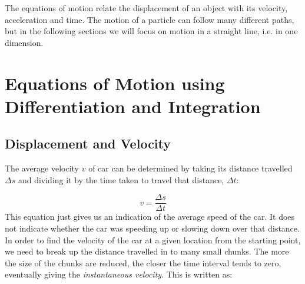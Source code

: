 





\addtolength{\topmargin}{-0.7 cm}
\setlength{\columnsep}{22pt}
\nll
The equations of motion relate the displacement of an object with its velocity, acceleration and time. The motion of a particle can follow many different paths, but in the following sections we will focus on motion in a straight line, i.e. in one dimension. 

\section{Equations of Motion using Differentiation and Integration}
\subsection{Displacement and Velocity}
The average velocity $v$ of car can be determined by taking its distance travelled $\Delta s$ and dividing it by the time taken to travel that distance, $\Delta t$:

\begin{equation}
v = \frac{\Delta s}{\Delta t}   
\end{equation}
This equation just gives us an indication of the average speed of the car. It does not indicate whether the car was speeding up or slowing down over that distance. In order to find the velocity of the car at a given location from the starting point, we need to break up the distance travelled in to many small chunks. The more the size of the chunks are reduced, the closer the time interval tends to zero, eventually giving the \textit{instantaneous velocity}. This is written as:

